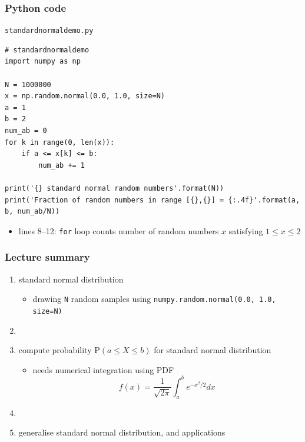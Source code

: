 \documentclass[english,14pt]{beamer}
\begin{document}

\begin{frame}[fragile]

\frametitle{Python code}

\texttt{standardnormaldemo.py}
\begin{lstlisting}[style=CStyle,basicstyle=\scriptsize]
# standardnormaldemo
import numpy as np

N = 1000000
x = np.random.normal(0.0, 1.0, size=N)
a = 1
b = 2
num_ab = 0
for k in range(0, len(x)):
    if a <= x[k] <= b:
        num_ab += 1

print('{} standard normal random numbers'.format(N))
print('Fraction of random numbers in range [{},{}] = {:.4f}'.format(a, b, num_ab/N))
\end{lstlisting}

\begin{itemize}
	\item lines 8--12: \texttt{for} loop counts number of random numbers $x$ satisfying $1 \leq x \leq 2$
\end{itemize}

\end{frame}


\begin{frame}[fragile]

\frametitle{Lecture summary}

\begin{enumerate}
	\item standard normal distribution
	\begin{itemize}
		\item drawing \texttt{N} random samples using \texttt{numpy.random.normal(0.0, 1.0, size=N)}
	\end{itemize}
	
	\item[]
	
	\item compute probability $\mathrm{P}(a \leq X \leq b)$ for standard normal distribution
	\begin{itemize}
		\item needs numerical integration using PDF
		\[
			f(x) = \frac{1}{\sqrt{2\pi}} \int_a^b e^{-x^2/2} dx
		\]
	\end{itemize}
	
	\item[]
	
	\item generalise standard normal distribution, and applications
	
\end{enumerate}

\end{frame}
\end{document}
